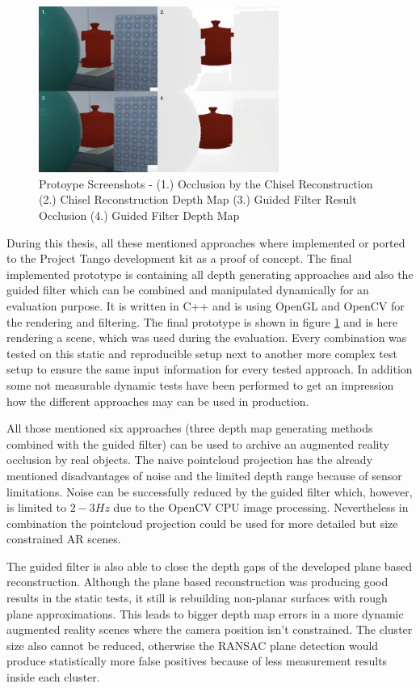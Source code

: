 \documentclass[12pt]{support/thcolognereport}
\begin{document}
\begin{figure}[h]
  \centering
	\includegraphics[width=0.7\textwidth]{content/images/report-demo.png} 
  \caption{Protoype Screenshots - (1.) Occlusion by the Chisel Reconstruction (2.) Chisel Reconstruction Depth Map (3.) Guided Filter Result Occlusion (4.) Guided Filter Depth Map}
  \label{fig:filter-demo}
\end{figure}

During this thesis, all these mentioned approaches where implemented or ported to the Project Tango development kit as a proof of concept. The final implemented prototype is containing all depth generating approaches and also the guided filter which can be combined and manipulated dynamically for an evaluation purpose. It is written in C++ and is using OpenGL and OpenCV for the rendering and filtering. The final prototype is shown in figure \ref{fig:filter-demo} and is here rendering a scene, which was used during the evaluation. Every combination was tested on this static and reproducible setup next to another more complex test setup to ensure the same input information for every tested approach. In addition some not measurable dynamic tests have been performed to get an impression how the different approaches may can be used in production.

All those mentioned six approaches (three depth map generating methods combined with the guided filter) can be used to archive an augmented reality occlusion by real objects. The naive pointcloud projection has the already mentioned disadvantages of noise and the limited depth range because of sensor limitations. Noise can be successfully reduced by the guided filter which, however, is limited to \(2-3Hz\) due to the OpenCV CPU image processing. Nevertheless in combination the pointcloud projection could be used for more detailed but size constrained AR scenes. 

The guided filter is also able to close the depth gaps of the developed plane based reconstruction. Although the plane based reconstruction was producing good results in the static tests, it still is rebuilding non-planar surfaces with rough plane approximations. This leads to bigger depth map errors in a more dynamic augmented reality scenes where the camera position isn't constrained. The cluster size also cannot be reduced, otherwise the RANSAC plane detection would produce statistically more false positives because of less measurement results inside each cluster. 
\end{document}
